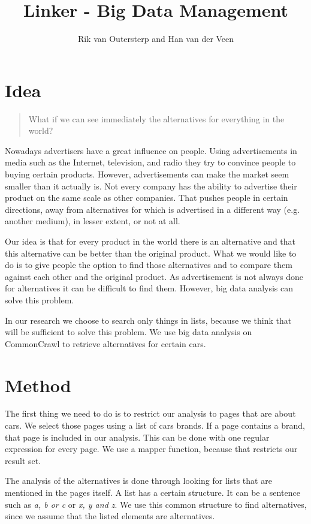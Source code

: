 \documentclass[a4paper,10pt]{article}
\title{Linker - Big Data Management}
\author{Rik van Outersterp and Han van der Veen}
\begin{document}
\maketitle
{}

\section{Idea}

\begin{quote}
What if we can see immediately the alternatives for everything in the world?
\end{quote}

Nowadays advertisers have a great influence on people. 
Using advertisements in media such as the Internet, television, and radio they try to convince people to buying certain products. 
However, advertisements can make the market seem smaller than it actually is.
Not every company has the ability to advertise their product on the same scale as other companies.
That pushes people in certain directions, away from alternatives for which is advertised in a different way (e.g. another medium), in lesser extent, or not at all.

Our idea is that for every product in the world there is an alternative and that this alternative can be better than the original product. %
What we would like to do is to give people the option to find those alternatives and to compare them against each other and the original product. 
As advertisement is not always done for alternatives it can be difficult to find them.
However, big data analysis can solve this problem.

In our research we choose to search only things in lists, because we think that will be sufficient to solve this problem.
We use big data analysis on CommonCrawl to retrieve alternatives for certain cars.

\section{Method}
The first thing we need to do is to restrict our analysis to pages that are about cars. 
We select those pages using a list of cars brands. 
If a page contains a brand, that page is included in our analysis. 
This can be done with one regular expression for every page. 
We use a mapper function, because that restricts our result set. 

The analysis of the alternatives is done through looking for lists that are mentioned in the pages itself. 
A list has a certain structure. It can be a sentence such as \emph{a, b or c} or \emph{x, y and z}. 
We use this common structure to find alternatives, since we assume that the listed elements are alternatives.
\end{document}
